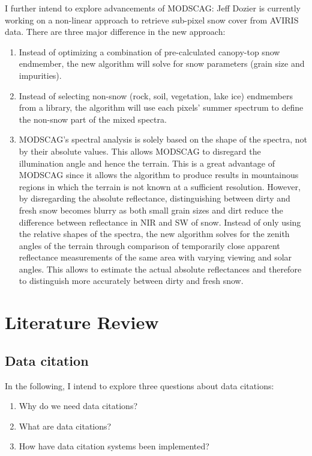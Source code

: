 \documentclass[a4paper,10pt]{article}
\begin{document}
I further intend to explore advancements of \gls{MODSCAG}: Jeff Dozier is currently working on a non-linear approach to retrieve sub-pixel snow cover from \gls{AVIRIS} data. There are three major difference in the new approach:
\begin{enumerate}
 \item Instead of optimizing a combination of pre-calculated canopy-top snow endmember, the new algorithm will solve for snow parameters (grain size and impurities).
 \item Instead of selecting non-snow (rock, soil, vegetation, lake ice) endmembers from a library, the algorithm will use each pixels' summer spectrum to define the non-snow part of the mixed spectra.
 \item \gls{MODSCAG}'s spectral analysis is solely based on the shape of the spectra, not by their absolute values. This allows \gls{MODSCAG} to disregard the illumination angle and hence the terrain. This is a great advantage of \gls{MODSCAG} since it allows the algorithm to produce results in mountainous regions in which the terrain is not known at a sufficient resolution. However, by disregarding the absolute reflectance, distinguishing between dirty and fresh snow becomes blurry as both small grain sizes and dirt reduce the difference between reflectance in \gls{NIR} and \gls{SW} of snow. Instead of only using the relative shapes of the spectra, the new algorithm solves for the zenith angles of the terrain through comparison of temporarily close apparent reflectance measurements of the same area with varying viewing and solar angles. This allows to estimate the actual absolute reflectances and therefore to distinguish more accurately between dirty and fresh snow.
\end{enumerate}


\newpage
\section{Literature Review}

\subsection{Data citation}
In the following, I intend to explore three questions about data citations:

\begin{enumerate}
 \item Why do we need data citations?
 \item What are data citations?
 \item How have data citation systems been implemented?
\end{enumerate}
\end{document}
